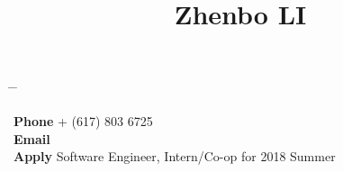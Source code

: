 

\title{Zhenbo LI} %

\vspace{-0.5cm}
\parbox[c][3em][t]{0.9\textwidth}{ %
	\begin{tabbing} %
		\hspace{3cm} \= \hspace{4cm} \= \kill %
		
{\bf Phone} \> + (617) 803 6725 \\ %
{\bf Email} \> \\
{\bf Apply} \> Software Engineer, Intern/Co-op for 2018 Summer
		
	\end{tabbing}
}

\vspace{3mm}